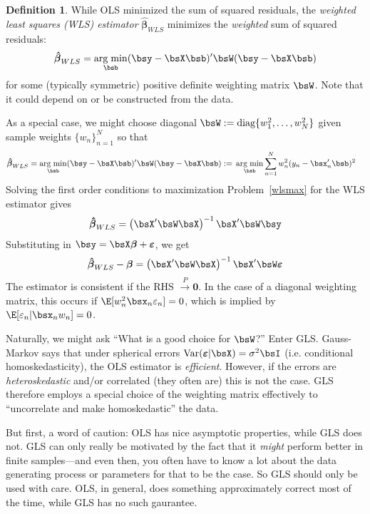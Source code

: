 \documentclass[12pt]{article}
\theoremstyle{plain}
\theoremstyle{definition}
\newtheorem{defn}[thm]{Definition}
\theoremstyle{remark}
\newcommand{\diag}{\text{diag}}
\newcommand{\bsvarepsilon}{\boldsymbol{\varepsilon}}
\newcommand{\bsbeta}{\boldsymbol{\beta}}
\newcommand{\bshatbeta}{\boldsymbol{\hat{\beta}}}
\renewcommand{\bso}{\boldsymbol{0}}
\DeclareMathOperator*{\argmin}{arg\;min}
\newcommand{\Var}{\operatorname{Var}}
\newcommand{\pto}{\xrightarrow{P}}
\newcommand{\sumnN}{\sum^N_{n=1}}
\newcommand{\nN}{_{n=1}^N}
\begin{document}
\begin{defn}
While OLS minimized the sum of squared residuals, the
\emph{weighted least squares (WLS) estimator} $\bshatbeta_{WLS}$
minimizes the \emph{weighted} sum of squared residuals:
\begin{align}
  \bshatbeta_{WLS}
  = \argmin_{\bsb}
  (\bsy - \bsX\bsb)'\bsW(\bsy - \bsX\bsb)
  \label{wlsmax}
\end{align}
for some (typically symmetric) positive definite weighting matrix
$\bsW$. Note that it could depend on or be constructed from the data.

As a special case, we might choose diagonal $\bsW :=
\diag\{w_1^2,\ldots,w_N^2\}$ given sample weights $\{w_n\}\nN$ so that
\begin{align*}
  \bshatbeta_{WLS}
  = \argmin_{\bsb}
  (\bsy - \bsX\bsb)'\bsW(\bsy - \bsX\bsb)
  :=&\; \argmin_{\bsb}
  \sumnN w_n^2(y_n - \bsx_n'\bsb)^2
\end{align*}
Solving the first order conditions to maximization Problem~\ref{wlsmax}
for the WLS estimator gives
\begin{align*}
  \bshatbeta_{WLS}
  = \left( \bsX'\bsW\bsX \right)^{-1} \bsX'\bsW \bsy
\end{align*}
Substituting in $\bsy=\bsX\bsbeta+\bsvarepsilon$, we get
\begin{align*}
  \bshatbeta_{WLS} - \bsbeta
  = \left( \bsX'\bsW\bsX \right)^{-1} \bsX'\bsW \bsvarepsilon
\end{align*}
The estimator is consistent if the RHS $\pto \bso$.
In the case of a diagonal weighting matrix, this occurs if
$\E[w_n^2\bsx_n\varepsilon_n]=0$, which is implied by
$\E[\varepsilon_n|\bsx_nw_n]=0$.
\end{defn}

Naturally, we might ask ``What is a good choice for $\bsW$?'' Enter GLS.
Gauss-Markov says that under spherical errors
$\Var(\bsvarepsilon|\bsX)=\sigma^2\bsI$ (i.e. conditional
homoskedasticity), the OLS estimator is \emph{efficient}. However, if
the errors are \emph{heteroskedastic} and/or correlated (they often are)
this is not the case. GLS therefore employs a special choice of the
weighting matrix effectively to ``uncorrelate and make homoskedastic''
the data.

But first, a word of caution: OLS has nice asymptotic properties, while
GLS does not. GLS can only really be motivated by the fact that it
\emph{might} perform better in finite samples---and even then, you often
have to know a lot about the data generating process or parameters for
that to be the case. So GLS should only be used with care. OLS, in
general, does something approximately correct most of the time, while
GLS has no such gaurantee.
\end{document}
